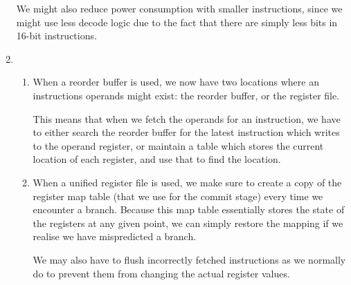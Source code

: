 \begin{enumerate}[label=(\alph*)]
    We might also reduce power consumption with smaller instructions, since we might use less decode logic due to the fact that there are simply less bits in 16-bit instructions.

  \item
    \begin{enumerate}[label=(\roman*)]
      \item
        When a reorder buffer is used, we now have two locations where an instructions operands might exist: the reorder buffer, or the register file.

        This means that when we fetch the operands for an instruction, we have to either search the reorder buffer for the latest instruction which writes to the operand register, or maintain a table which stores the current location of each register, and use that to find the location.

      \item
        When a unified register file is used, we make sure to create a copy of the register map table (that we use for the commit stage) every time we encounter a branch. Because this map table essentially stores the state of the registers at any given point, we can simply restore the mapping if we realise we have mispredicted a branch.

        We may also have to flush incorrectly fetched instructions as we normally do to prevent them from changing the actual register values.
        
    \end{enumerate}


        
\end{enumerate}

